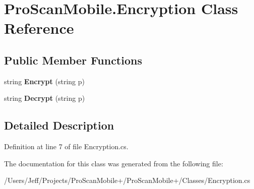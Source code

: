 \hypertarget{class_pro_scan_mobile_1_1_encryption}{\section{Pro\-Scan\-Mobile.\-Encryption Class Reference}
\label{class_pro_scan_mobile_1_1_encryption}
}
\subsection*{Public Member Functions}
\begin{DoxyCompactItemize}
\item 
\hypertarget{class_pro_scan_mobile_1_1_encryption_aa6fc2bbd504c6fad47e3198a909c40b2}{string {\bfseries Encrypt} (string p)}\label{class_pro_scan_mobile_1_1_encryption_aa6fc2bbd504c6fad47e3198a909c40b2}

\item 
\hypertarget{class_pro_scan_mobile_1_1_encryption_ab7d506d23f821c4ee65a2c10767f26b3}{string {\bfseries Decrypt} (string p)}\label{class_pro_scan_mobile_1_1_encryption_ab7d506d23f821c4ee65a2c10767f26b3}

\end{DoxyCompactItemize}


\subsection{Detailed Description}


Definition at line 7 of file Encryption.\-cs.



The documentation for this class was generated from the following file\-:\begin{DoxyCompactItemize}
\item 
/\-Users/\-Jeff/\-Projects/\-Pro\-Scan\-Mobile+/\-Pro\-Scan\-Mobile+/\-Classes/Encryption.\-cs\end{DoxyCompactItemize}
